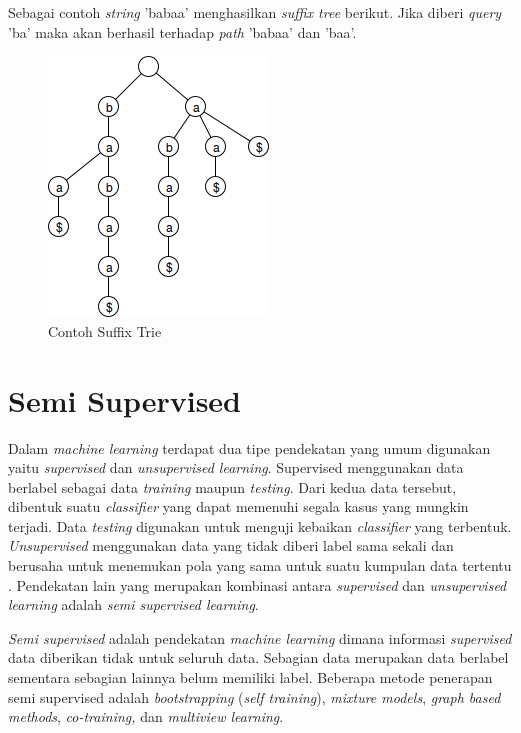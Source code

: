Sebagai contoh \textit{string} 'babaa' menghasilkan \textit{suffix tree} berikut. Jika diberi \textit{query} 'ba' maka akan berhasil terhadap \textit{path} 'babaa' dan 'baa'.
\begin{figure}
    \centering
    \includegraphics[scale=0.6]{pics/Contoh-SuffixTree}
    \caption{Contoh Suffix Trie}
    \label{fig:contoh-suffix-trie}
\end{figure}

\section{Semi Supervised}
Dalam \textit{machine learning} terdapat dua tipe pendekatan yang umum digunakan yaitu \textit{supervised} dan \textit{unsupervised learning}. Supervised menggunakan data berlabel sebagai data \textit{training} maupun \textit{testing}. Dari kedua data tersebut, dibentuk suatu \textit{classifier} yang dapat memenuhi segala kasus yang mungkin terjadi. Data \textit{testing} digunakan untuk menguji kebaikan \textit{classifier} yang terbentuk. \textit{Unsupervised} menggunakan data yang tidak diberi label sama sekali dan berusaha untuk menemukan pola yang sama untuk suatu kumpulan data tertentu \citep{prakash2014survey}. Pendekatan lain yang merupakan kombinasi antara \textit{supervised} dan \textit{unsupervised learning} adalah \textit{semi supervised learning}. 

\textit{Semi supervised} adalah pendekatan \textit{machine learning} dimana informasi \textit{supervised} data diberikan tidak untuk seluruh data. Sebagian data merupakan data berlabel sementara sebagian lainnya belum memiliki label. Beberapa metode penerapan semi supervised adalah \textit{bootstrapping} (\textit{self training}), \textit{mixture models}, \textit{graph based methods}, \textit{co-training,} dan \textit{multiview learning}.


